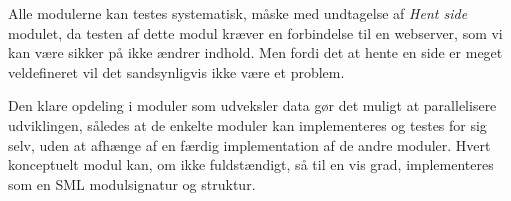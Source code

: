 \documentclass[a4paper,oneside,article, titlepage]{article}
\begin{document}
Alle modulerne kan testes systematisk, måske med undtagelse af
\textit{Hent side} modulet, da testen af dette modul kræver en
forbindelse til en webserver, som vi kan være sikker på ikke ændrer
indhold. Men fordi det at hente en side er meget veldefineret vil det
sandsynligvis ikke være et problem.

Den klare opdeling i moduler som udveksler data gør det muligt at
parallelisere udviklingen, således at de enkelte moduler kan
implementeres og testes for sig selv, uden at afhænge af en færdig
implementation af de andre moduler. Hvert konceptuelt modul kan, om
ikke fuldstændigt, så til en vis grad, implementeres som en SML
modulsignatur og struktur.
\end{document}
